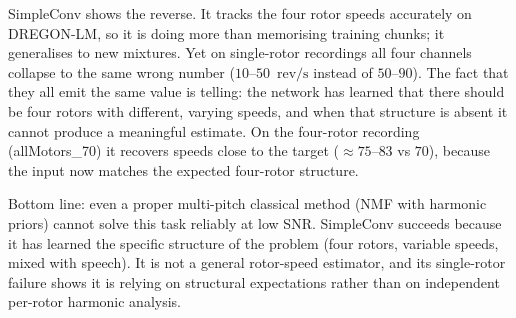 \documentclass[11pt,a4paper]{article}
\newcommand{\revps}{\ensuremath{\mathrm{rev}/\mathrm{s}}}
\begin{document}
SimpleConv shows the reverse.  It tracks the four rotor speeds accurately
on DREGON-LM, so it is doing more than memorising training chunks; it
generalises to new mixtures.  Yet on single-rotor recordings all four
channels collapse to the same wrong number ($10$--$50$~\revps{} instead of
$50$--$90$).  The fact that they all emit the same value is telling: the
network has learned that there should be four rotors with different,
varying speeds, and when that structure is absent it cannot produce a
meaningful estimate.  On the four-rotor recording (allMotors\_70) it
recovers speeds close to the target ($\approx 75$--$83$ vs $70$), because
the input now matches the expected four-rotor structure.

Bottom line: even a proper multi-pitch classical method (NMF with harmonic
priors) cannot solve this task reliably at low SNR.  SimpleConv succeeds
because it has learned the specific structure of the problem (four rotors,
variable speeds, mixed with speech).  It is not a general rotor-speed
estimator, and its single-rotor failure shows it is relying on structural
expectations rather than on independent per-rotor harmonic analysis.
\end{document}
